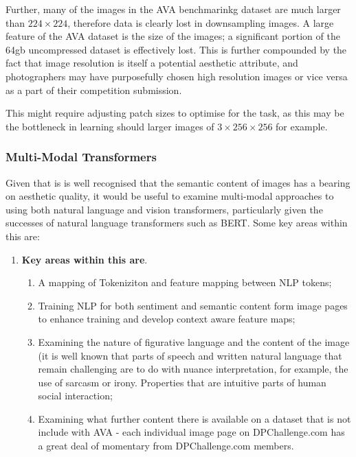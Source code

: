 Further, many of the images in the AVA benchmarinkg dataset are much larger than $ 224 \times 224$, therefore data is clearly lost in downsampling images. A large feature of the AVA dataset is the size of the images; a significant portion of the 64gb uncompressed dataset is effectively lost. This is further compounded by the fact that image resolution is itself a potential aesthetic attribute, and photographers may have purposefully chosen high resolution images or vice versa as a part of their competition submission. 

This might require adjusting patch sizes to optimise for the task, as this may be the bottleneck in learning should larger images of $3 \times 256 \times 256 $ for example. 

\subsubsection{Multi-Modal Transformers}
\label{sec:multi-modal transformers}
Given that is is well recognised that the semantic content of images has a bearing on aesthetic quality\cite{Simond2015,Mullennix2020}, it would be useful to examine multi-modal approaches to using both natural language and vision transformers, particularly given the successes of natural language transformers such as BERT\cite{Devlin2019, Wolf2020a}.
Some key areas within this are:
\begin{enumerate}
\item \textbf{Key areas within this are}.
        \begin{enumerate}
        \item A mapping of Tokeniziton and feature mapping between NLP tokens;
        \item Training NLP for both sentiment and semantic content form image pages to enhance training and develop context aware feature maps; 
        \item Examining the nature of figurative language and the content of the image (it is well known that parts of speech and written natural language that remain challenging are to do with nuance interpretation, for example, the use of sarcasm or irony. Properties that are intuitive parts of human social interaction;
        \item Examining what further content there is available on a dataset that is not include with AVA - each individual image page on DPChallenge.com has a great deal of momentary from DPChallenge.com members.
        
    \end{enumerate}

\end{enumerate}

